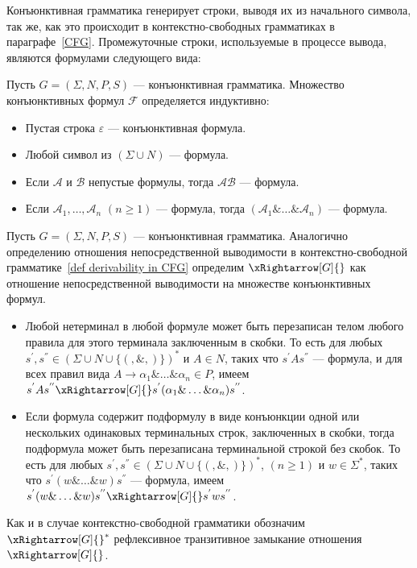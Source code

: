 Конъюнктивная грамматика генерирует строки, выводя их из начального символа, так же, как это происходит в контекстно-свободных грамматиках в параграфе~\ref{CFG}. Промежуточные строки, используемые в процессе вывода, являются формулами следующего вида:

\begin{definition}\label{Definition of conjunctive formula}
	Пусть $G = (\Sigma,N,P,S)$ --- конъюнктивная грамматика. Множество конъюнктивных формул $ \mathcal{F}$ определяется индуктивно:
	\begin{itemize}
		\item Пустая строка $\varepsilon$ --- конъюнктивная формула. 
		\item Любой символ из $(\Sigma \cup N)$ --- формула.
		\item Если $\mathcal{A}$ и $\mathcal{B}$ непустые формулы, тогда $\mathcal{AB}$ --- формула.
		\item Если $\mathcal{A}_1,\ldots,\mathcal{A}_n$ $(n \geqslant 1)$ --- формула, тогда $(\mathcal{A}_1\&\ldots\&\mathcal{A}_n)$ --- формула.
	\end{itemize}
\end{definition}

\begin{definition}
	Пусть $G = (\Sigma,N,P,S)$ --- конъюнктивная грамматика. Аналогично определению отношения непосредственной выводимости в контекстно-свободной грамматике~\ref{def derivability in CFG} определим $\xRightarrow[G]{}$ как отношение непосредственной выводимости на множестве конъюнктивных формул.
	\begin{itemize}
	    \item Любой нетерминал в любой формуле может быть перезаписан телом любого правила для этого терминала заключенным в скобки. То есть для любых $s^{'},s^{''} \in (\Sigma \cup N \cup \{(, \&, )\})^*$ и $A\in N$, таких что $s^{'}As^{''}$ --- формула, и для всех правил вида $A \rightarrow \alpha_1\&\ldots\&\alpha_n \in P$, имеем $s^{'}As^{''}\xRightarrow[G]{}s^{'}(\alpha_1\&\ldots\&\alpha_n)s^{''}$. 
	    \item Если формула содержит подформулу в виде конъюнкции одной или нескольких одинаковых терминальных строк, заключенных в скобки, тогда подформула может быть перезаписана терминальной строкой без скобок. То есть для любых $s^{'},s^{''} \in (\Sigma \cup N \cup \{(, \&, )\})^*$, $(n \geqslant 1)$ и $w \in \Sigma^*$, таких что $s^{'}(w\&\ldots\&w)s^{''}$ --- формула, имеем $s^{'}(w\&\ldots\&w)s^{''}\xRightarrow[G]{}s^{'}ws^{''}$.
	\end{itemize}
	Как и в случае контекстно-свободной грамматики обозначим $\xRightarrow[G]{}^*$ рефлексивное транзитивное замыкание отношения $\xRightarrow[G]{}$.
\end{definition}

